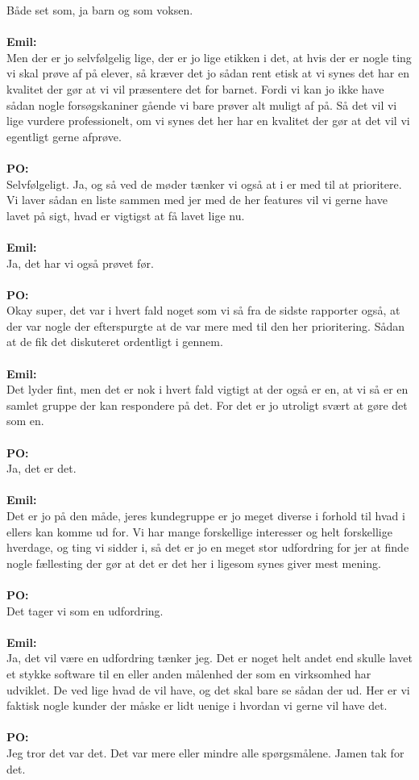 Både set som, ja barn og som voksen.
\\\\
\textbf{Emil:}\\
Men der er jo selvfølgelig lige, der er jo lige etikken i det, at hvis der er nogle ting vi skal prøve af på elever, så kræver det jo sådan rent etisk at vi synes det har en kvalitet der gør at vi vil præsentere det for barnet.
Fordi vi kan jo ikke have sådan nogle forsøgskaniner gående vi bare prøver alt muligt af på.
Så det vil vi lige vurdere professionelt, om vi synes det her har en kvalitet der gør at det vil vi egentligt gerne afprøve.
\\\\
\textbf{PO:}\\
Selvfølgeligt.
Ja, og så ved de møder tænker vi også at i er med til at prioritere. 
Vi laver sådan en liste sammen med jer med de her features vil vi gerne have lavet på sigt, hvad er vigtigst at få lavet lige nu.
\\\\
\textbf{Emil:}\\
Ja, det har vi også prøvet før. 
\\\\
\textbf{PO:}\\
Okay super, det var i hvert fald noget som vi så fra de sidste rapporter også, at der var nogle der efterspurgte at de var mere med til den her prioritering. 
Sådan at de fik det diskuteret ordentligt i gennem.
\\\\
\textbf{Emil:}\\
Det lyder fint, men det er nok i hvert fald vigtigt at der også er en, at vi så er en samlet gruppe der kan respondere på det.
For det er jo utroligt svært at gøre det som en.
\\\\
\textbf{PO:}\\
Ja, det er det. 
\\\\
\textbf{Emil:}\\
Det er jo på den måde, jeres kundegruppe er jo meget diverse i forhold til hvad i ellers kan komme ud for.
Vi har mange forskellige interesser og helt forskellige hverdage, og ting vi sidder i, så det er jo en meget stor udfordring for jer at finde nogle fællesting der gør at det er det her i ligesom synes giver mest mening.
\\\\
\textbf{PO:}\\
Det tager vi som en udfordring.
\\\\
\textbf{Emil:}\\
Ja, det vil være en udfordring tænker jeg.
Det er noget helt andet end skulle lavet et stykke software til en eller anden målenhed der som en virksomhed har udviklet.
De ved lige hvad de vil have, og det skal bare se sådan der ud.
Her er vi faktisk nogle kunder der måske er lidt uenige i hvordan vi gerne vil have det. 
\\\\
\textbf{PO:}\\
Jeg tror det var det. Det var mere eller mindre alle spørgsmålene. Jamen tak for det.
